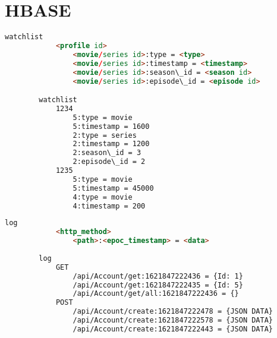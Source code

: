 \section{HBASE}

\begin{tcolorbox}
    \lstset{style=htmlstyle}
    \begin{lstlisting}[language={html}, caption={Watchlist HBASE Model}, label={lst:watchlist}]
        watchlist
            <profile id>
                <movie/series id>:type = <type>
                <movie/series id>:timestamp = <timestamp>
                <movie/series id>:season\_id = <season id>
                <movie/series id>:episode\_id = <episode id>

        watchlist
            1234
                5:type = movie
                5:timestamp = 1600
                2:type = series
                2:timestamp = 1200
                2:season\_id = 3
                2:episode\_id = 2
            1235
                5:type = movie
                5:timestamp = 45000
                4:type = movie
                4:timestamp = 200
    \end{lstlisting}
\end{tcolorbox}

\begin{tcolorbox}
    \lstset{style=htmlstyle}
    \begin{lstlisting}[language={html}, caption={Logs HBASE Model}, label={lst:log}]
        log
            <http_method>
                <path>:<epoc_timestamp> = <data>
    
        log
            GET
                /api/Account/get:1621847222436 = {Id: 1}
                /api/Account/get:1621847222435 = {Id: 5}
                /api/Account/get/all:1621847222436 = {}
            POST
                /api/Account/create:1621847222478 = {JSON DATA}
                /api/Account/create:1621847222578 = {JSON DATA}
                /api/Account/create:1621847222443 = {JSON DATA}
    \end{lstlisting}
\end{tcolorbox}